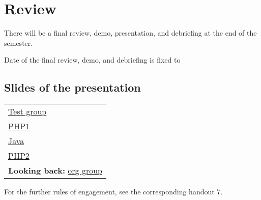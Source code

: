 
\section*{Review}
\label{sec:review}

There will be a final review, demo, presentation, and debriefing at the end
of the semester.


Date of the final review, demo, and debriefing is fixed to
\begin{center}
\end{center}




\subsection*{Slides of the presentation}



\begin{center}
  \begin{tabular}{l}
  \\\hline
  \href{slides/review/tests/slides.pdf}{Test group}
  \\
  \href{slides/review/php1/index.php}{PHP1}
  \\
  \href{slides/review/java/slides.pdf}{Java}
  \\
  \href{slides/review/php2/slides.pdf}{PHP2}
  \\
  \textbf{Looking back:} \href{slides/review/org/slides.pdf}{org group}
  \\\hline
\end{tabular}
\end{center}



For the further rules of engagement, see the corresponding handout 7.















